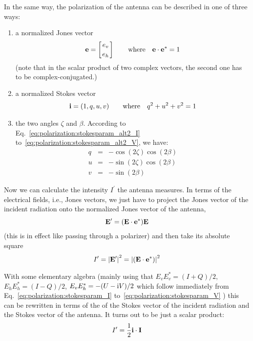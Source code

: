 In the same way, the polarization of the antenna can be described in
one of three ways:
\begin{enumerate}
\item a normalized Jones vector
\begin{equation}
\mathbf{e}= \left[e_v \atop e_h\right]\qquad
   \mbox{where}\quad \mathbf{e}\cdot\mathbf{e}^\ast = 1
 \end{equation}
(note  that in the scalar product of two complex vectors, the second one
has to be complex-conjugated.)

\item a normalized Stokes vector 
\begin{equation}
\mathbf{i} = (1, q, u, v)\qquad
   \mbox{where}\quad q^2+u^2+v^2=1
 \end{equation}
 
\item the
  two angles $\zeta$ and $\beta$.  According to
  Eq.~\ref{eq:polarization:stokesparam_alt2_I}
  to~\ref{eq:polarization:stokesparam_alt2_V}, we have:
\begin{eqnarray}
  \label{eq:polarization:antenna-q}
 q &=&  - \cos(2\zeta)\cos(2\beta)\\ 
  \label{eq:polarization:antenna-u}
 u &=& - \sin(2\zeta)\cos(2\beta)\\
  \label{eq:polarization:antenna-v}
 v &=& - \sin(2\beta)
\end{eqnarray}
\end{enumerate}

Now we can calculate the intensity $I^\prime$ 
the antenna measures. In terms of the electrical fields, 
i.e., Jones vectors,  we just have to
project the Jones vector  of the incident radiation onto the
normalized Jones vector  of the antenna,
\begin{equation}
  \label{eq:polarization:antenna-projection}
   \mathbf{E}^\prime =  (\mathbf{E}\cdot\mathbf{e}^\ast) \mathbf{E}
\end{equation}
(this is in effect like passing through a polarizer) and then take its
absolute square
\begin{equation}
  \label{eq:polarization:antenna:intensity-jones}
  I^\prime =  \left| \mathbf{E}^{\prime} \right| ^2 
   = \left|(\mathbf{E}\cdot\mathbf{e}^\ast) \right| ^2 
\end{equation}

With some elementary algebra (mainly using that $E_v E_v^\ast =
(I+Q)/2$, $E_h E_h^\ast = (I-Q)/2$, $E_v E_h^\ast = -(U - \mathrm{i} V)/2$
which follow immediately from Eq.~\ref{eq:polarization:stokesparam_I}
to~\ref{eq:polarization:stokesparam_V} ) this can be rewritten in
terms of the of the  Stokes vector  of the incident
radiation and the Stokes vector  of the antenna.
It turns out to be just a scalar product:
\begin{equation}
  \label{eq:polarization:antenna:intensity-stokes}
  I^\prime = \frac{1}{2}\mathbf{i}\cdot\mathbf{I}
\end{equation}

